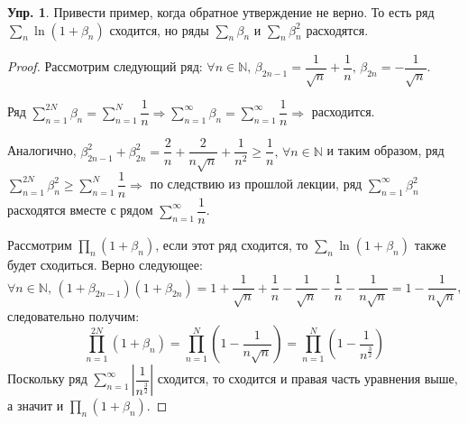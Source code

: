 \documentclass[12pt]{article}
\newcommand{\MN}{\mathbb{N}}
\theoremstyle{definition}
\newtheorem{exrc}{Упр.}
\begin{document}
\begin{exrc}
	Привести пример, когда обратное утверждение не верно. То есть ряд $\displaystyle \sum\limits_n \ln(1 + \beta_n)$ сходится, но ряды $\displaystyle \sum\limits_n \beta_n$ и $\displaystyle \sum\limits_n\beta_n^2$ расходятся.
\end{exrc}
\begin{proof}
	Рассмотрим следующий ряд: $\forall n \in \MN, \, \beta_{2n -1} = \dfrac{1}{\sqrt{n}} + \dfrac{1}{n}, \, \beta_{2n} = -\dfrac{1}{\sqrt{n}}$.
	
	Ряд $\displaystyle \sum\limits_{n = 1}^{2N} \beta_n = \sum\limits_{n = 1}^{N} \dfrac{1}{n} \Rightarrow \displaystyle \sum\limits_{n = 1}^{\infty} \beta_n = \sum\limits_{n = 1}^{\infty} \dfrac{1}{n} \Rightarrow$ расходится. 
	
	Аналогично, $\beta_{2n-1}^2 + \beta_{2n}^2 = \dfrac{2}{n} + \dfrac{2}{n\sqrt{n}} + \dfrac{1}{n^2} \geq \dfrac{1}{n}, \, \forall n \in \MN$ и таким образом, ряд $\displaystyle \sum\limits_{n = 1}^{2N} \beta_n^2 \geq \sum\limits_{n = 1}^{N} \dfrac{1}{n} \Rightarrow$ по следствию из прошлой лекции, ряд $\displaystyle \sum\limits_{n = 1}^{\infty} \beta_n^2$ расходятся вместе с рядом $\sum\limits_{n = 1}^{\infty} \dfrac{1}{n}$.
	
	Рассмотрим $\displaystyle \prod\limits_n (1 + \beta_n)$, если этот ряд сходится, то $\displaystyle \sum\limits_n \ln(1 + \beta_n)$ также будет сходиться. Верно следующее: $\forall n \in \MN, \, (1 + \beta_{2n-1})(1 + \beta_{2n}) = 1 + \dfrac{1}{\sqrt{n}} + \dfrac{1}{n} - \dfrac{1}{\sqrt{n}} - \dfrac{1}{n} - \dfrac{1}{n\sqrt{n}} = 1 - \dfrac{1}{n\sqrt{n}}$, следовательно получим:
	$$
		\displaystyle \prod\limits_{n = 1}^{2N}(1 + \beta_n) = \prod\limits_{n = 1}^{N}\left(1 - \dfrac{1}{n\sqrt{n}}\right) = \prod\limits_{n = 1}^{N}\left(1 - \dfrac{1}{n^{\frac{3}{2}}}\right)
	$$
	Поскольку ряд $\displaystyle \sum\limits_{n = 1}^{\infty}\left|\dfrac{1}{n^{\frac{3}{2}}}\right|$ сходится, то сходится и правая часть уравнения выше, а значит и $\displaystyle \prod\limits_n (1 + \beta_n)$.
\end{proof}

\newpage
\end{document}
